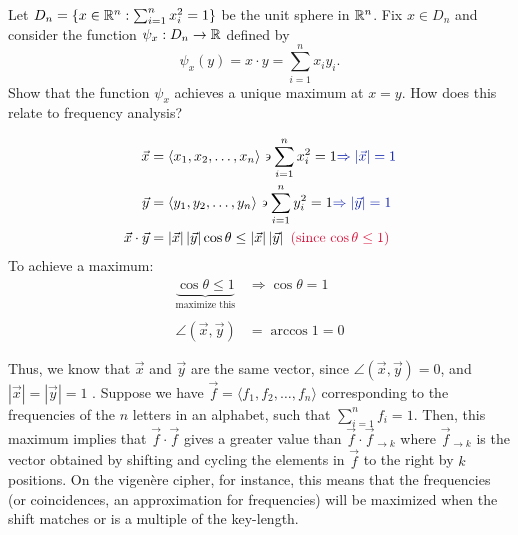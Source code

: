 \begin{problem}
Let $D_n = \{x \in \mathbb{R}^n : \sum_{i=1}^n x_i^2 = 1\}$ be the unit sphere
in $\mathbb{R}^n$.  Fix $x \in D_n$ and consider the function $\psi_x : D_n
\to \mathbb{R}$ defined by
\[
\psi_x(y) = x \cdot y = \sum_{i=1}^n x_i y_i.
\]
Show that the function $\psi_x$ achieves a unique maximum at $x=y$.
How does this relate to frequency analysis?
\end{problem}

\begin{Answer}
\begin{align*}
  \vec{x} &= \langle x_1, x_2, \dots, x_n\rangle \backepsilon \sum_{i=1}^n x_i^2 = 1 \zaff{\Rightarrow \left | \vec{x} \right | = 1}\\
  \vec{y} &= \langle y_1, y_2, \dots, y_n\rangle \backepsilon \sum_{i=1}^n y_i^2 = 1 \zaff{\Rightarrow \left | \vec{y} \right | = 1}\\
  \vec{x} \cdot \vec{y} &=\left | \vec{x} \right |\left | \vec{y} \right |\cos\theta
  \le \left | \vec{x} \right |\left | \vec{y} \right | \crim{\text{    (since $\cos \theta \le 1$)}}
\end{align*}
\noindent
To achieve a maximum:
\begin{align*}
  \underbrace{\cos \theta \le 1}_{\text{maximize this}} &\Rightarrow \cos \theta = 1\\
  \\
  \angle(\vec{x}, \vec{y}) &= \arccos 1 = 0
\end{align*}

\noindent
Thus, we know that $\vec{x}$ and $\vec{y}$ are the same vector,
since $\angle(\vec{x}, \vec{y}) = 0$,
and $\left | \vec{x} \right | = \left | \vec{y} \right| = 1$
.
\newline
\newline
\noindent
\color{zaffre}
Suppose we have $\vec{f} = \langle f_1, f_2, \dots, f_n\rangle$
corresponding to the frequencies of the
$n$ letters in an alphabet, such that $\sum_{i=1}^n f_i = 1$.
Then, this maximum implies that $\vec{f} \cdot \vec{f}$
gives a greater value than $\vec{f} \cdot \vec{f}_{\to k}$ where $\vec{f}_{\to k}$ is the vector
obtained by shifting and cycling the elements in $\vec{f}$ to the right by $k$ positions.
\newline
On the vigen\`ere cipher, for instance, this means that the frequencies (or coincidences, an approximation for frequencies)
will be maximized when the shift matches or is a multiple of the key-length.
\end{Answer}
